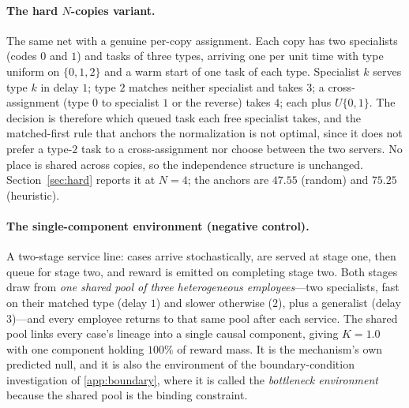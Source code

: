 \documentclass[review,authoryear,3p,times]{elsarticle}
\begin{document}
\paragraph{The hard $N$-copies variant.} The same net with a genuine per-copy
assignment. Each copy has two specialists (codes $0$ and $1$) and tasks of
three types, arriving one per unit time with type uniform on $\{0,1,2\}$ and a
warm start of one task of each type. Specialist $k$ serves type $k$ in delay
$1$; type $2$ matches neither specialist and takes $3$; a cross-assignment
(type $0$ to specialist $1$ or the reverse) takes $4$; each plus $U\{0,1\}$.
The decision is therefore which queued task each free specialist takes, and the
matched-first rule that anchors the normalization is not optimal, since it does
not prefer a type-$2$ task to a cross-assignment nor choose between the two
servers. No place is shared across copies, so the independence structure is
unchanged. Section~\ref{sec:hard} reports it at $N=4$; the anchors are
$47.55$ (random) and $75.25$ (heuristic).

\paragraph{The single-component environment (negative control).}
A two-stage service line: cases arrive stochastically, are served at stage one,
then queue for stage two, and reward is emitted on completing stage two. Both
stages draw from \emph{one shared pool of three heterogeneous employees}---two
specialists, fast on their matched type (delay $1$) and slower otherwise
($2$), plus a generalist (delay $3$)---and every employee returns to that same
pool after each service. The shared pool links every case's lineage into a
single causal component, giving $K=1.0$ with one component holding $100\%$ of
reward mass. It is the mechanism's own predicted null, and it is also the
environment of the boundary-condition investigation of
\ref{app:boundary}, where it is called the \emph{bottleneck
environment} because the shared pool is the binding constraint.
\end{document}

